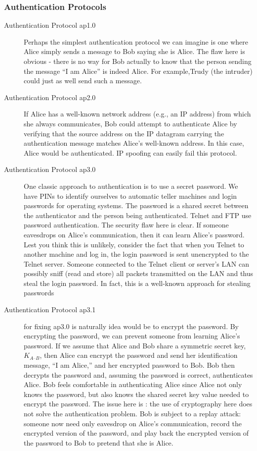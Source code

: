 \documentclass[twoside]{article}
\begin{document}
\subsubsection{Authentication Protocols}
\begin{description}

\item[ Authentication Protocol ap1.0]Perhaps the simplest authentication protocol we can imagine is one where Alice simply sends a message to Bob saying she is Alice. The flaw here is obvious - there is no way for Bob actually to know that the person sending the message “I am Alice” is indeed Alice. For example,Trudy (the intruder) could just as well send such a message.

\item[Authentication Protocol ap2.0] If Alice has a well-known network address (e.g., an IP address) from which she always communicates, Bob could attempt to authenticate Alice by verifying that the source address on the IP datagram carrying the authentication message matches Alice’s well-known address. In this case, Alice would be authenticated. IP spoofing can easily fail this protocol.

\item[ Authentication Protocol ap3.0] One classic approach to authentication is to use a secret password. We have PINs to identify ourselves to automatic teller machines and login passwords for operating systems. The password is a shared secret between the authenticator and the person being authenticated. Telnet and FTP use password authentication. The security flaw here is clear. If someone eavesdrops on Alice’s communication, then it can learn Alice’s password. Lest you think this is unlikely, consider the fact that when you Telnet to another machine and log in, the login password is sent unencrypted to the Telnet server. Someone connected
to the Telnet client or server’s LAN can possibly sniff (read and store) all
packets transmitted on the LAN and thus steal the login password. In fact, this is a
well-known approach for stealing passwords 

\item[Authentication Protocol ap3.1] for fixing ap3.0 is naturally idea would be to encrypt the password. By encrypting the password, we can prevent someone from learning Alice’s password. If we assume that Alice and Bob share a symmetric secret key, $K_{A–B}$, then Alice can encrypt the password and send her identification message, “I am Alice,” and her encrypted password to Bob. Bob then decrypts the password and, assuming the password is correct, authenticates Alice. Bob feels comfortable in authenticating Alice since Alice not only knows the password, but also knows the shared secret key value needed to encrypt the password.  The issue here is : the use of cryptography here does not solve the authentication problem. Bob is subject to a replay attack: someone now need only eavesdrop on Alice’s communication, record the encrypted version of the password, and play back the encrypted version of the password to Bob to pretend that she is Alice. 


\end{description}
\end{document}
